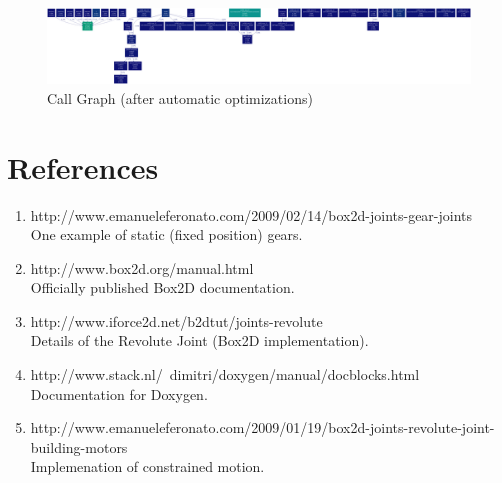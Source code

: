 \documentclass [a4paper, 11pt] {article}
\begin{document}
\begin{figure}[htpb]
	\includegraphics[width=\linewidth]{doc/images/release10K}
	\caption{Call Graph (after automatic optimizations)}
\end{figure}

\section {References}

\begin {enumerate}
	\item http://www.emanueleferonato.com/2009/02/14/box2d-joints-gear-joints\\	
	One example of static (fixed position) gears.
	\item http://www.box2d.org/manual.html\\
	Officially published Box2D documentation.
	\item http://www.iforce2d.net/b2dtut/joints-revolute\\
	Details of the Revolute Joint (Box2D implementation).
	\item http://www.stack.nl/~dimitri/doxygen/manual/docblocks.html\\
	Documentation for Doxygen.
	\item http://www.emanueleferonato.com/2009/01/19/box2d-joints-revolute-joint-building-motors\\
	Implemenation of constrained motion.
\end {enumerate}
\end{document}
